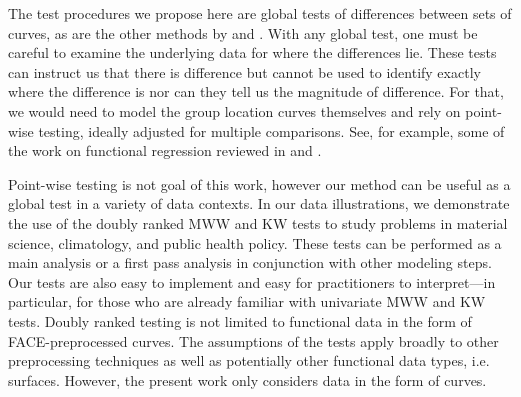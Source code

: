 \documentclass[12pt]{article}
\theoremstyle{plain}
\theoremstyle{remark}
\begin{document}
	The test procedures we propose here are global tests of differences between sets of curves, as are the other methods by \cite{Hall2007,Lopez2009,Lopez2010,Chak2015,Berrett2021} and \cite{Melendez2021}. With any global test, one must be careful to examine the underlying data for where the differences lie. These tests can instruct us that there is difference but cannot be used to identify exactly where the difference is nor can they tell us the magnitude of difference. For that, we would need to model the group location curves themselves and rely on point-wise testing, ideally adjusted for multiple comparisons. See, for example, some of the work on functional regression reviewed in \cite{Morris2015} and \cite{Greven2017}.
	
	Point-wise testing is not goal of this work, however our method can be useful as a global test in a variety of data contexts. In our data illustrations, we demonstrate the use of the doubly ranked MWW and KW tests to study problems in material science, climatology, and public health policy. 
	These tests can be performed as a main analysis or a first pass analysis in conjunction with other modeling steps. Our tests are also easy to implement and easy for practitioners to interpret---in particular, for those who are already familiar with univariate MWW and KW tests. Doubly ranked testing is not limited to functional data in the form of FACE-preprocessed curves. The assumptions of the tests apply broadly to other preprocessing techniques as well as potentially other functional data types, i.e. surfaces. However, the present work only considers data in the form of curves.
%	
	
\end{document}
